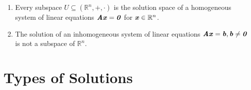 \begin{enumerate}
    \item Every subspace $U \subseteq (\mathbb{R}^n , +, \cdot)$ is the solution space of a homogeneous system of linear equations $\text{\textbf{\textit{Ax}}} = \text{\textbf{\textit{0}}}$ for $\text{\textbf{\textit{x}}} \in \mathbb{R}^n$.
    \hfill \cite{mfml/book/mml/Deisenroth-Faisal-Ong}

    \item The solution of an inhomogeneous system of linear equations $\text{\textbf{\textit{Ax}}} = \text{\textbf{\textit{b}}}, \text{\textbf{\textit{b}}} \neq \text{\textbf{\textit{0}}}$ is not a subspace of $\mathbb{R}^n$.
    \hfill \cite{mfml/book/mml/Deisenroth-Faisal-Ong}

    
\end{enumerate}








\section{Types of Solutions}

